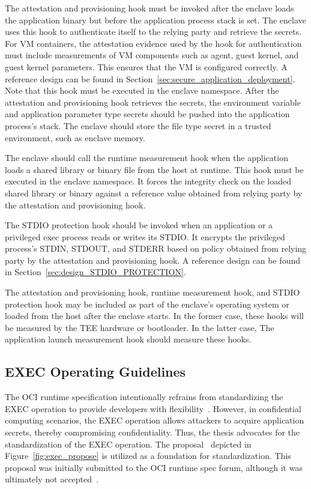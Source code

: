   The attestation and provisioning hook must be invoked after the enclave loads the application binary but before the application process stack is set. The enclave uses this hook to authenticate itself to the relying party and retrieve the secrets. For VM containers, the attestation evidence used by the hook for authentication must include measurements of 
  VM components such as agent, guest kernel, and guest kernel parameters. This ensures that the VM is configured correctly. A reference design can be found in Section~\ref{sec:secure_application_deployment}. Note that this hook must be 
  executed in the enclave namespace. After the attestation and provisioning hook retrieves the secrets, the environment variable and application parameter type secrets should be pushed into the application process's stack. The enclave should store the file type secret in a trusted environment, such as enclave memory. 
   
   
  The enclave should call the runtime measurement hook when the application loads a shared library or binary file from the host at runtime. This hook must be executed in the enclave namespace. It forces the integrity check on the loaded shared library or binary against a reference value obtained from relying party by the attestation and provisioning hook.    
   
   
  The STDIO protection hook should be invoked when an application or a privileged exec process reads or writes its STDIO. It encrypts the privileged process's STDIN, STDOUT, and STDERR based on policy obtained from relying party by the attestation and provisioning hook. A reference design can be found in Section~\ref{sec:design_STDIO_PROTECTION}.
   
  The attestation and provisioning hook, runtime measurement hook, and STDIO protection hook may be included as part of the enclave's operating system or loaded from the host after the enclave starts. In the former case, these hooks will be measured by the \acrshort{TEE} hardware or bootloader. In the latter case, The application launch measurement hook should measure 
  these hooks. 
\subsection{EXEC Operating Guidelines}
\label{subsec:oci_exec}
The OCI runtime specification intentionally refrains from standardizing the EXEC operation to provide developers with flexibility~\cite*{exec_semantics}. However, in confidential computing scenarios, the EXEC operation allows attackers to acquire application secrets, thereby compromising confidentiality. Thus, the thesis advocates for the 
standardization of the EXEC operation. The proposal~\cite*{exec_proposal} depicted in Figure~\ref{fig:exec_propose} is utilized as a foundation for standardization. This proposal was initially submitted to the OCI runtime spec forum, although it was ultimately not accepted~\cite*{exec_semantics}.
 
